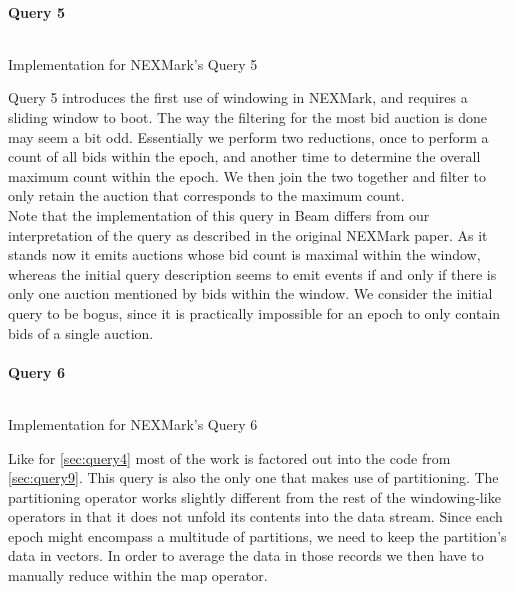 \paragraph{Query 5}
\begin{listing}[H]
  \inputminted[firstline=611,lastline=620]{rust}{benchmarks/src/nexmark.rs}
  \caption{Implementation for NEXMark's Query 5}
  \label{lst:nexmark-query5}
\end{listing}

Query 5 introduces the first use of windowing in NEXMark, and requires a sliding window to boot. The way the filtering for the most bid auction is done may seem a bit odd. Essentially we perform two reductions, once to perform a count of all bids within the epoch, and another time to determine the overall maximum count within the epoch. We then join the two together and filter to only retain the auction that corresponds to the maximum count. \\

Note that the implementation of this query in Beam differs from our interpretation of the query as described in the original NEXMark paper. As it stands now it emits auctions whose bid count is maximal within the window, whereas the initial query description seems to emit events if and only if there is only one auction mentioned by bids within the window. We consider the initial query to be bogus, since it is practically impossible for an epoch to only contain bids of a single auction.

\paragraph{Query 6}
\begin{listing}[H]
  \inputminted[firstline=645,lastline=647]{rust}{benchmarks/src/nexmark.rs}
  \caption{Implementation for NEXMark's Query 6}
  \label{lst:nexmark-query6}
\end{listing}

Like for \autoref{sec:query4} most of the work is factored out into the code from \autoref{sec:query9}. This query is also the only one that makes use of partitioning. The partitioning operator works slightly different from the rest of the windowing-like operators in that it does not unfold its contents into the data stream. Since each epoch might encompass a multitude of partitions, we need to keep the partition's data in vectors. In order to average the data in those records we then have to manually reduce within the map operator.

